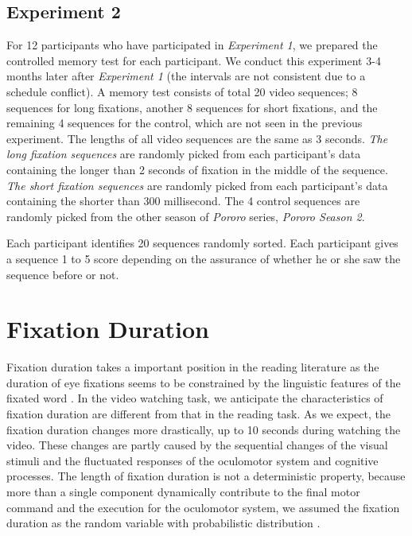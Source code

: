\documentclass[10pt,letterpaper]{article}
\begin{document}
\subsection{Experiment 2}

For 12 participants who have participated in \textit{Experiment 1}, we prepared the controlled memory test for each participant. We conduct this experiment 3-4 months later after \textit{Experiment 1} (the intervals are not consistent due to a schedule conflict). A memory test consists of total 20 video sequences; 8 sequences for long fixations, another 8 sequences for short fixations, and the remaining 4 sequences for the control, which are not seen in the previous experiment. The lengths of all video sequences are the same as 3 seconds. \textit{The long fixation sequences} are randomly picked from each participant's data containing the longer than 2 seconds of fixation in the middle of the sequence. \textit{The short fixation sequences} are randomly picked from each participant's data containing the shorter than 300 millisecond. The 4 control sequences are randomly picked from the other season of \textit{Pororo} series, \textit{Pororo Season 2}.

Each participant identifies 20 sequences randomly sorted. Each participant gives a sequence 1 to 5 score depending on the assurance of whether he or she saw the sequence before or not. 

\section{Fixation Duration}
\label{sec:fixation-duration}

Fixation duration takes a important position in the reading literature as the duration of eye fixations seems to be constrained by the linguistic features of the fixated word \cite{Rayner1998}. In the video watching task, we anticipate the characteristics of fixation duration are different from that in the reading task. As we expect, the fixation duration changes more drastically, up to 10 seconds during watching the video. These changes are partly caused by the sequential changes of the visual stimuli and the fluctuated responses of the oculomotor system and cognitive processes. The length of fixation duration is not a deterministic property, because more than a single component dynamically contribute to the final motor command and the execution for the oculomotor system, we assumed the fixation duration as the random variable with probabilistic distribution \cite{Rayner1998,Reichle2004,Reichle2006}.
\end{document}
